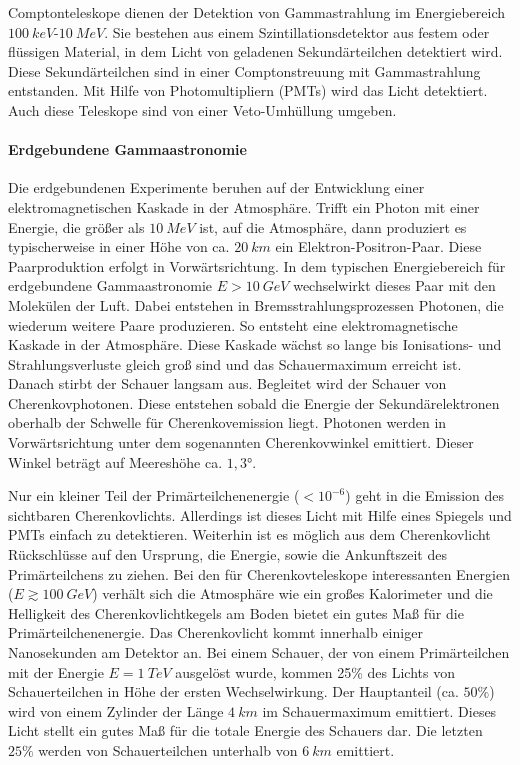 Comptonteleskope dienen der Detektion von Gammastrahlung im Energiebereich $\SI{100}{keV}$-$\SI{10}{MeV}$.
Sie bestehen aus einem Szintillationsdetektor aus festem oder flüssigen Material, in dem Licht von geladenen Sekundärteilchen detektiert wird.
Diese Sekundärteilchen sind in einer Comptonstreuung mit Gammastrahlung entstanden.
Mit Hilfe von Photomultipliern (PMTs) wird das Licht detektiert.
Auch diese Teleskope sind von einer Veto-Umhüllung umgeben.\cite{Weekes}

\paragraph{Erdgebundene Gammaastronomie}
Die erdgebundenen Experimente beruhen auf der Entwicklung einer elektromagnetischen Kaskade in der Atmosphäre.
Trifft ein Photon mit einer Energie, die größer als $\SI{10}{MeV}$ ist, auf die Atmosphäre, dann produziert es typischerweise in einer Höhe von ca. $\SI{20}{km}$ ein Elektron-Positron-Paar.
Diese Paarproduktion erfolgt in Vorwärtsrichtung.
In dem typischen Energiebereich für erdgebundene Gammaastronomie $E>\SI{10}{GeV}$ wechselwirkt dieses Paar mit den Molekülen der Luft.
Dabei entstehen in Bremsstrahlungsprozessen Photonen, die wiederum weitere Paare produzieren.
So entsteht eine elektromagnetische Kaskade in der Atmosphäre.
Diese Kaskade wächst so lange bis Ionisations- und Strahlungsverluste gleich groß sind und das Schauermaximum erreicht ist.
Danach stirbt der Schauer langsam aus.
Begleitet wird der Schauer von Cherenkovphotonen.
Diese entstehen sobald die Energie der Sekundärelektronen oberhalb der Schwelle für Cherenkovemission liegt.
Photonen werden in Vorwärtsrichtung unter dem sogenannten Cherenkovwinkel emittiert. 
Dieser Winkel beträgt auf Meereshöhe ca. $1,3°$.\cite{Weekes}

Nur ein kleiner Teil der Primärteilchenenergie ($<10^{-6}$) geht in die Emission des sichtbaren Cherenkovlichts.
Allerdings ist dieses Licht mit Hilfe eines Spiegels und PMTs einfach zu detektieren.
Weiterhin ist es möglich aus dem Cherenkovlicht Rückschlüsse auf den Ursprung, die Energie, sowie die Ankunftszeit des Primärteilchens zu ziehen.
Bei den für Cherenkovteleskope interessanten Energien ($E\gtrsim \SI{100}{GeV}$) verhält sich die Atmosphäre wie ein großes Kalorimeter und die Helligkeit des Cherenkovlichtkegels am Boden bietet ein gutes Maß für die Primärteilchenenergie.
Das Cherenkovlicht kommt innerhalb einiger Nanosekunden am Detektor an.
Bei einem Schauer, der von einem Primärteilchen mit der Energie $E=\SI{1}{TeV}$ ausgelöst wurde, kommen 25\% des Lichts von Schauerteilchen in Höhe der ersten Wechselwirkung.
Der Hauptanteil (ca. $50\%$) wird von einem Zylinder der Länge $\SI{4}{km}$ im Schauermaximum emittiert.
Dieses Licht stellt ein gutes Maß für die totale Energie des Schauers dar.
Die letzten $25\%$ werden von Schauerteilchen unterhalb von $\SI{6}{km}$ emittiert.\cite{Weekes}

